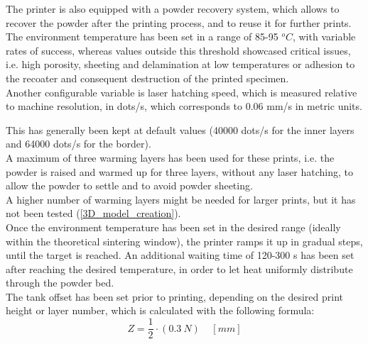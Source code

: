 \documentclass{article}
\begin{document}
        The printer is also equipped with a powder recovery system, which allows to recover the powder 
        after the printing process, and to reuse it for further prints. \\ 

        The environment temperature has been set in a range of 85-95 $^oC$, with variable rates of success, 
        whereas values outside this threshold showcased critical issues, i.e. high porosity, sheeting and 
        delamination at low temperatures or adhesion to the recoater and consequent destruction of the printed specimen. \\ 

        Another configurable variable is laser hatching speed, which is measured relative to machine resolution, in dots/s, 
        which corresponds to 0.06 mm/s in metric units. 

        This has generally been kept at default values (40000 dots/s for the inner layers and 64000 dots/s for the border).  \\ 

        A maximum of three warming layers has been used for these prints, i.e. the powder is raised and warmed 
        up for three layers, without any laser hatching, to allow the powder to settle and to avoid 
        powder sheeting. \\ 
        A higher number of warming layers might be needed for larger prints, but it has not been tested 
        (\ref{3D_model_creation}). \\

        Once the environment temperature has been set in the desired range (ideally within the theoretical 
        sintering window), the printer ramps it up in gradual steps, until the target is reached.  
        An additional waiting time of 120-300 s has been set after reaching the desired temperature, in order to let heat 
        uniformly distribute through the powder bed. \\

        The tank offset has been set prior to printing, depending on the desired print height or 
        layer number, which is calculated with the following formula: \\
        
        \begin{equation}
            Z =  \frac{1}{2} \cdot (0.3 \  N) \ \ \ \ \  [mm]
            \label{eq:layer_height}
        \end{equation}
        
\end{document}
